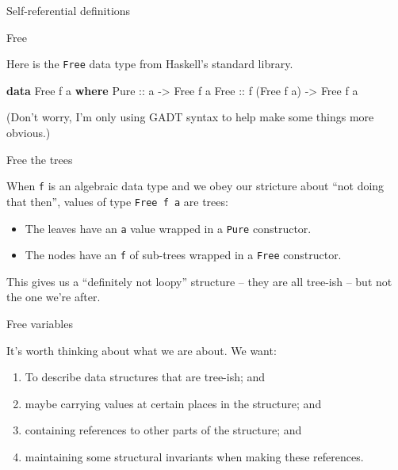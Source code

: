 \documentclass[ignorenonframetext]{beamer}
\newenvironment{Shaded}{}{}
\newcommand{\DataTypeTok}[1]{\textcolor[rgb]{0.56,0.13,0.00}{#1}}
\newcommand{\KeywordTok}[1]{\textcolor[rgb]{0.00,0.44,0.13}{\textbf{#1}}}
\newcommand{\NormalTok}[1]{#1}
\newcommand{\OtherTok}[1]{\textcolor[rgb]{0.00,0.44,0.13}{#1}}
\begin{document}
\begin{frame}{Self-referential definitions}
\begin{frame}[fragile]{%
\protect\hypertarget{free}{%
Free}}

Here is the \texttt{Free} data type from Haskell’s standard library.

\begin{Shaded}
\begin{Highlighting}[]
\KeywordTok{data} \DataTypeTok{Free}\NormalTok{ f a }\KeywordTok{where}
  \DataTypeTok{Pure}\OtherTok{ ::}\NormalTok{ a }\OtherTok{->} \DataTypeTok{Free}\NormalTok{ f a}
  \DataTypeTok{Free}\OtherTok{ ::}\NormalTok{ f (}\DataTypeTok{Free}\NormalTok{ f a) }\OtherTok{->} \DataTypeTok{Free}\NormalTok{ f a}
\end{Highlighting}
\end{Shaded}

(Don’t worry, I’m only using GADT syntax to help make some things more
obvious.)

\end{frame}

\begin{frame}[fragile]{%
\protect\hypertarget{free-the-trees}{%
Free the trees}}

When \texttt{f} is an algebraic data type and we obey our stricture
about “not doing that then”, values of type \texttt{Free\ f\ a} are
trees:

\begin{itemize}
\item
  The leaves have an \texttt{a} value wrapped in a \texttt{Pure}
  constructor.
\item
  The nodes have an \texttt{f} of sub-trees wrapped in a \texttt{Free}
  constructor.
\end{itemize}

This gives us a “definitely not loopy” structure – they are all tree-ish
– but not the one we’re after.

\end{frame}

\begin{frame}{%
\protect\hypertarget{free-variables}{%
Free variables}}

It’s worth thinking about what we are about. We want:

\begin{enumerate}
[1.]
\item
  To describe data structures that are tree-ish; and
\item
  maybe carrying values at certain places in the structure; and
\item
  containing references to other parts of the structure; and
\item
  maintaining some structural invariants when making these references.
\end{enumerate}


\end{frame}
\end{frame}
\end{document}
